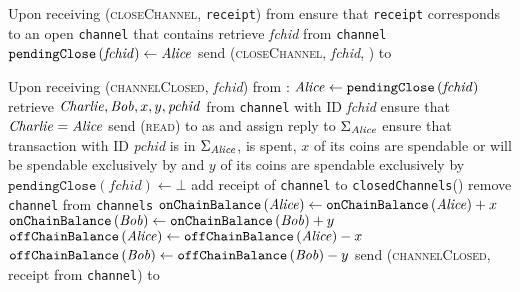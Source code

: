 \begin{functionality}{\fpaynet}
\begin{algorithmic}[1]
    \State Upon receiving (\textsc{closeChannel}, \texttt{receipt}) from \alice
     
    \Indent
      \State ensure that \texttt{receipt} corresponds to an open
      \texttt{channel} that contains \alice
      \State retrieve \textit{fchid} from \texttt{channel}
      \State $\mathtt{pendingClose}\left(\mathit{fchid}\right) \gets \mathit{Alice}$
      \State send (\textsc{closeChannel}, \textit{fchid}, \alice) to \simulator
    \EndIndent
    \State

    \State Upon receiving (\textsc{channelClosed}, \textit{fchid}) from
    \simulator:
    \Indent
      \State $\mathit{Alice} \gets \mathtt{pendingClose}\left(\mathit{fchid}\right)$
      \State retrieve $\mathit{Charlie}, \mathit{Bob}, x, y, \mathit{pchid}$ from
      \texttt{channel} with ID \textit{fchid}
      \State ensure that $\mathit{Charlie}{} = \mathit{Alice}$
      \State send (\textsc{read}) to \ledger{} as \alice{} and assign reply to
      $\Sigma_{\mathit{Alice}}$
      \State ensure that transaction with ID \textit{pchid} is in
      $\Sigma_{\mathit{Alice}}$, is spent, $x$ of its coins are spendable or
      will be spendable exclusively by \alice{} and $y$ of its coins are
      spendable exclusively by \bob
      \State $\mathtt{pendingClose}\left(\mathit{fchid}\right) \gets \bot$
      \State add receipt of \texttt{channel} to \texttt{closedChannels}(\bob)
      \State remove \texttt{channel} from \texttt{channels}
      \State $\mathtt{onChainBalance}\left(\mathit{Alice}\right) \gets
      \mathtt{onChainBalance}\left(\mathit{Alice}\right) + x$
      \State $\mathtt{onChainBalance}\left(\mathit{Bob}\right) \gets
      \mathtt{onChainBalance}\left(\mathit{Bob}\right) + y$
      \State $\mathtt{offChainBalance}\left(\mathit{Alice}\right) \gets
      \mathtt{offChainBalance}\left(\mathit{Alice}\right) - x$
      \State $\mathtt{offChainBalance}\left(\mathit{Bob}\right) \gets
      \mathtt{offChainBalance}\left(\mathit{Bob}\right) - y$
      \State send (\textsc{channelClosed}, receipt from \texttt{channel}) to
      \alice
    \EndIndent
    \State


\end{algorithmic}
\end{functionality}
